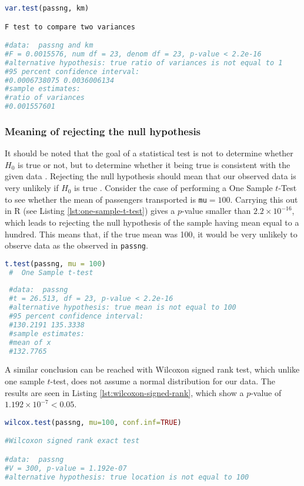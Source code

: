 \documentclass[letterpaper, 10 pt, conference]{article}
\begin{document}
\begin{lstlisting}[language=R, caption={Fisher's F test}, label={lst:fisher} ]
var.test(passng, km)

F test to compare two variances

#data:  passng and km
#F = 0.0015576, num df = 23, denom df = 23, p-value < 2.2e-16
#alternative hypothesis: true ratio of variances is not equal to 1
#95 percent confidence interval:
#0.0006738075 0.0036006134
#sample estimates:
#ratio of variances 
#0.001557601 
\end{lstlisting}

\subsubsection{Meaning of rejecting the null hypothesis}
It should be noted that the goal of a statistical test is not to determine whether $H_0$ is true or not, but to determine whether it being true is consistent with the given data \cite{Ross_2010}. Rejecting the null hypothesis should mean that our observed data is very unlikely if $H_0$ is true \cite{Ross_2010}.
Consider the case of performing a One Sample $t$-Test to see whether the mean of passengers transported is \texttt{mu}$ = 100$.  Carrying this out in R (see Listing \ref{lst:one-sample-t-test}) gives a $p$-value smaller than $2.2 \times 10^{-16}$, which leads to rejecting the null hypothesis of the sample having mean equal to a hundred. This means that, if the true mean was 100, it would be very unlikely to observe data as the observed in \texttt{passng}.
\begin{lstlisting}[language=R, caption={One sample t-test.}, label={lst:one-sample-t-test} ]
 t.test(passng, mu = 100)
 #	One Sample t-test
 
 #data:  passng
 #t = 26.513, df = 23, p-value < 2.2e-16
 #alternative hypothesis: true mean is not equal to 100
 #95 percent confidence interval:
 #130.2191 135.3338
 #sample estimates:
 #mean of x 
 #132.7765 
 \end{lstlisting}
 
 A similar conclusion can be reached with Wilcoxon signed rank test, which unlike one sample $t$-test, does not assume a normal distribution for our data. The results are seen in Listing \ref{lst:wilcoxon-signed-rank}, which show a $p$-value of $1.192 \times 10^{-7} < 0.05$.
  \begin{lstlisting}[language=R, caption={Wilcoxon signed rank test.}, label={lst:wilcoxon-signed-rank} ]
wilcox.test(passng, mu=100, conf.inf=TRUE)

#Wilcoxon signed rank exact test

#data:  passng
#V = 300, p-value = 1.192e-07
#alternative hypothesis: true location is not equal to 100
 \end{lstlisting}
\end{document}
